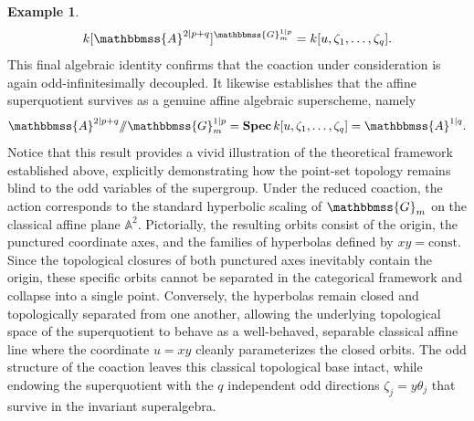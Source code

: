 \documentclass[11pt,a4paper,reqno,noamsfonts]{amsart}
\numberwithin{equation}{section}
\theoremstyle{definition}
\newtheorem{example}[theorem]{Example}
\theoremstyle{remark}
\renewcommand{\AA}{\ensuremath{\mathbbmss{A}}}
\newcommand{\GG}{\ensuremath{\mathbbmss{G}}}
\DeclareMathOperator{\sSpec}{\mathbf{Spec}}
\begin{document}
\begin{example}
$$
k[\AA^{2\vert p+q}]^{\GG_m^{1 \vert p}} = k[u,\zeta_1,\dots,\zeta_q]. 
$$
This final algebraic identity confirms that the coaction under consideration is again odd-infinitesimally decoupled. It likewise establishes that the affine superquotient survives as a genuine affine algebraic superscheme, namely
$$
\AA^{2\vert p+q} {\sslash} \GG_m^{1 \vert p} = \sSpec  k[u,\zeta_1,\dots,\zeta_q] = \AA^{1 \vert q}. 
$$
Notice that this result provides a vivid illustration of the theoretical framework established above, explicitly demonstrating how the point-set topology remains blind to the odd variables of the supergroup. Under the reduced coaction, the action corresponds to the standard hyperbolic scaling of $\GG_{m}$ on the classical affine plane $\mathbb{A}^{2}$. Pictorially, the resulting orbits consist of the origin, the punctured coordinate axes, and the families of hyperbolas defined by $xy = \text{const}$. Since the topological closures of both punctured axes inevitably contain the origin, these specific orbits cannot be separated in the categorical framework and collapse into a single point. Conversely, the hyperbolas remain closed and topologically separated from one another, allowing the underlying topological space of the superquotient to behave as a well-behaved, separable classical affine line where the coordinate $u = xy$ cleanly parameterizes the closed orbits. The odd structure of the coaction leaves this classical topological base intact, while endowing the superquotient with the $q$ independent odd directions $\zeta_j = y\theta_j$ that survive in the invariant superalgebra.
\end{example}
\end{document}

